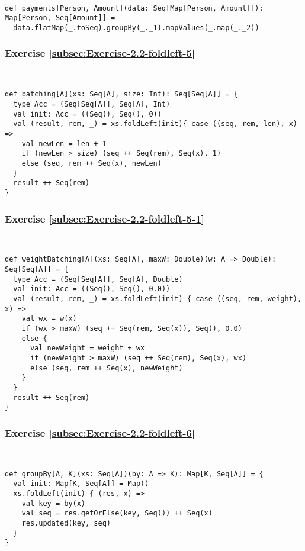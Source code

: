 ~
\begin{lstlisting}
def payments[Person, Amount](data: Seq[Map[Person, Amount]]): Map[Person, Seq[Amount]] =
  data.flatMap(_.toSeq).groupBy(_._1).mapValues(_.map(_._2))
\end{lstlisting}


\subsubsection*{Exercise \ref{subsec:Exercise-2.2-foldleft-5}}

~
\begin{lstlisting}
def batching[A](xs: Seq[A], size: Int): Seq[Seq[A]] = {  
  type Acc = (Seq[Seq[A]], Seq[A], Int)
  val init: Acc = ((Seq(), Seq(), 0))
  val (result, rem, _) = xs.foldLeft(init){ case ((seq, rem, len), x) =>
    val newLen = len + 1
    if (newLen > size) (seq ++ Seq(rem), Seq(x), 1)
    else (seq, rem ++ Seq(x), newLen)
  }
  result ++ Seq(rem)
}
\end{lstlisting}


\subsubsection*{Exercise \ref{subsec:Exercise-2.2-foldleft-5-1}}

~
\begin{lstlisting}
def weightBatching[A](xs: Seq[A], maxW: Double)(w: A => Double): Seq[Seq[A]] = {  
  type Acc = (Seq[Seq[A]], Seq[A], Double)
  val init: Acc = ((Seq(), Seq(), 0.0))
  val (result, rem, _) = xs.foldLeft(init) { case ((seq, rem, weight), x) =>
    val wx = w(x)
    if (wx > maxW) (seq ++ Seq(rem, Seq(x)), Seq(), 0.0)
    else {
      val newWeight = weight + wx
      if (newWeight > maxW) (seq ++ Seq(rem), Seq(x), wx)
      else (seq, rem ++ Seq(x), newWeight)
    }
  }
  result ++ Seq(rem)
}
\end{lstlisting}


\subsubsection*{Exercise \ref{subsec:Exercise-2.2-foldleft-6}}

~
\begin{lstlisting}
def groupBy[A, K](xs: Seq[A])(by: A => K): Map[K, Seq[A]] = {  
  val init: Map[K, Seq[A]] = Map()
  xs.foldLeft(init) { (res, x) =>
    val key = by(x)
    val seq = res.getOrElse(key, Seq()) ++ Seq(x)
    res.updated(key, seq)
  }
}
\end{lstlisting}


